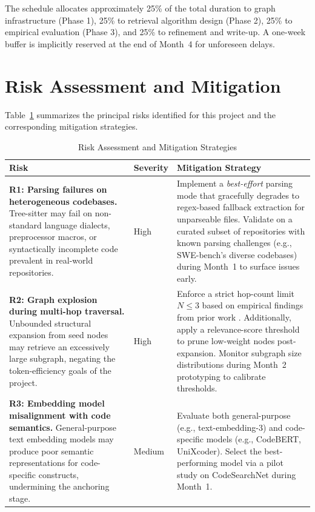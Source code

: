 \documentclass[11pt, a4paper]{article}
\begin{document}
\noindent The schedule allocates approximately 25\% of the total duration to graph infrastructure (Phase 1), 25\% to retrieval algorithm design (Phase 2), 25\% to empirical evaluation (Phase 3), and 25\% to refinement and write-up. A one-week buffer is implicitly reserved at the end of Month~4 for unforeseen delays.

\section{Risk Assessment and Mitigation}
Table~\ref{tab:risks} summarizes the principal risks identified for this project and the corresponding mitigation strategies.

\begin{table}
\centering
\caption{Risk Assessment and Mitigation Strategies}
\label{tab:risks}
\begin{tabular}{@{}p{5cm} p{2cm} p{6.7cm}@{}}
\toprule
\textbf{Risk} & \textbf{Severity} & \textbf{Mitigation Strategy} \\
\midrule
\textbf{R1: Parsing failures on heterogeneous codebases.} Tree-sitter may fail on non-standard language dialects, preprocessor macros, or syntactically incomplete code prevalent in real-world repositories. & High & Implement a \textit{best-effort} parsing mode that gracefully degrades to regex-based fallback extraction for unparseable files. Validate on a curated subset of repositories with known parsing challenges (e.g., SWE-bench's diverse codebases) during Month~1 to surface issues early. \\
\hline
\textbf{R2: Graph explosion during multi-hop traversal.} Unbounded structural expansion from seed nodes may retrieve an excessively large subgraph, negating the token-efficiency goals of the project. & High & Enforce a strict hop-count limit $N \leq 3$ based on empirical findings from prior work \cite{liu2025enhancing}. Additionally, apply a relevance-score threshold to prune low-weight nodes post-expansion. Monitor subgraph size distributions during Month~2 prototyping to calibrate thresholds. \\
\hline
\textbf{R3: Embedding model misalignment with code semantics.} General-purpose text embedding models may produce poor semantic representations for code-specific constructs, undermining the anchoring stage. & Medium & Evaluate both general-purpose (e.g., text-embedding-3) and code-specific models (e.g., CodeBERT, UniXcoder). Select the best-performing model via a pilot study on CodeSearchNet during Month~1. \\

\end{tabular}
\end{table}
\end{document}
